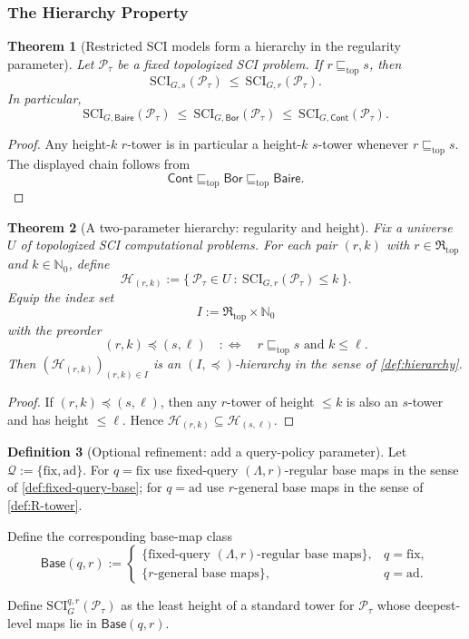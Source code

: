 \documentclass{lmcs} %
\theoremstyle{plain}
\theoremstyle{plain}
\newtheorem{theorem}{Theorem}[section]
\theoremstyle{definition}
\newtheorem{definition}[theorem]{Definition}
\theoremstyle{remark}
\theoremstyle{definition}
\theoremstyle{remark}
\numberwithin{equation}{section}
\newcommand{\N}{\mathbb{N}}
\newcommand{\Bor}{\mathsf{Bor}}
\newcommand{\Cont}{\mathsf{Cont}}
\newcommand{\BaireMeas}{\mathsf{Baire}}
\begin{document}
\subsubsection{The Hierarchy Property}

\begin{theorem}[Restricted SCI models form a hierarchy in the regularity parameter]\label{thm:hierarchy-in-R}
Let $\mathcal{P}_\tau$ be a fixed topologized SCI problem.
If $r \sqsubseteq_{\mathrm{top}} s$,
then
\[
\mathrm{SCI}_{G,s}(\mathcal{P}_\tau) \ \le\ \mathrm{SCI}_{G,r}(\mathcal{P}_\tau).
\]
In particular,
\[
\mathrm{SCI}_{G,\BaireMeas}(\mathcal{P}_\tau)\ \le\ \mathrm{SCI}_{G,\Bor}(\mathcal{P}_\tau)\ \le\ \mathrm{SCI}_{G,\Cont}(\mathcal{P}_\tau).
\]
\end{theorem}
\begin{proof}
Any height-$k$ $r$-tower is in particular a height-$k$ $s$-tower whenever
$r \sqsubseteq_{\mathrm{top}} s$. The displayed chain follows from
\[
\Cont\sqsubseteq_{\mathrm{top}}\Bor
\sqsubseteq_{\mathrm{top}}\BaireMeas.
\]
\end{proof}

\begin{theorem}[A two-parameter hierarchy: regularity and height]\label{thm:two-parameter-hierarchy}
Fix a universe $U$ of topologized SCI computational problems.
For each pair $(r,k)$ with $r\in\mathfrak{R}_{\mathrm{top}}$ and $k\in\N_0$, define
\[
\mathcal{H}_{(r,k)} := \{\ \mathcal{P}_\tau\in U\ :\ \mathrm{SCI}_{G,r}(\mathcal{P}_\tau)\le k\ \}.
\]
Equip the index set
\[
I:=\mathfrak{R}_{\mathrm{top}}\times\mathbb N_0
\]
with the preorder
\[
(r,k)\preceq(s,\ell)
\quad:\Longleftrightarrow\quad
r\sqsubseteq_{\mathrm{top}} s \text{ and } k\le \ell.
\]
Then $(\mathcal{H}_{(r,k)})_{(r,k)\in I}$ is an $(I,\preceq)$-hierarchy in the sense of \cref{def:hierarchy}.
\end{theorem}

\begin{proof}
If $(r,k)\preceq(s,\ell)$, then any $r$-tower of height $\le k$
is also an $s$-tower and has height $\le \ell$. Hence $\mathcal{H}_{(r,k)}\subseteq \mathcal{H}_{(s,\ell)}$.
\end{proof}

\begin{definition}[Optional refinement: add a query-policy parameter]\label{def:Q-R-refinement}
Let $\mathcal{Q}:=\{\mathrm{fix},\mathrm{ad}\}$.
For $q=\mathrm{fix}$ use fixed-query $(\Lambda,r)$-regular base maps in the sense of \cref{def:fixed-query-base};
for $q=\mathrm{ad}$ use $r$-general base maps in the sense of \cref{def:R-tower}.

Define the corresponding base-map class
\[
\mathsf{Base}(q,r)
:=
\begin{cases}
\{\text{fixed-query $(\Lambda,r)$-regular base maps}\}, & q=\mathrm{fix},\\
\{\text{$r$-general base maps}\}, & q=\mathrm{ad}.
\end{cases}
\]

Define \(\mathrm{SCI}^{q,r}_G(\mathcal P_\tau)\) as the least height of a standard tower for \(\mathcal P_\tau\) whose deepest-level maps lie in \(\mathsf{Base}(q,r)\).
\end{definition}
\end{document}
